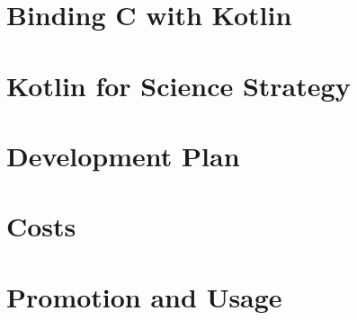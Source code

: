 \documentclass[10pt,twocolumn, a4paper]{article}
\begin{document}
	\section{Binding C with Kotlin}
	\section{Kotlin for Science Strategy}
	\section{Development Plan}
	\section{Costs}
	\section{Promotion and Usage}
\end{document}
